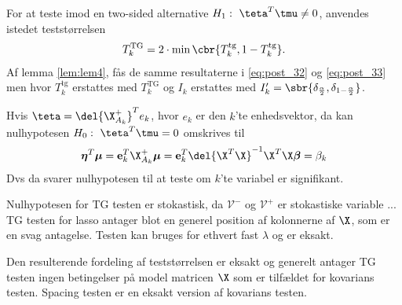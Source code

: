 For at teste imod en two-sided alternative \(H_1: \ \teta^T \tmu \neq 0\), anvendes istedet teststørrelsen
\begin{align*}
T_k^\text{TG}= 2 \cdot \min \cbr{T_k^{\text{tg}}, 1-T_k^{\text{tg}}}.
\end{align*}
Af lemma \ref{lem:lem4}, fås de samme resultaterne i \eqref{eq:post_32} og \eqref{eq:post_33} men hvor \(T_k^\text{tg}\) erstattes med \(T_k^\text{TG}\) og \(I_k\) erstattes med \(I_k'= \sbr{\delta_{\frac{\alpha}{2}}, \delta_{1-\frac{\alpha}{2}}}\).


Hvis \(\teta = \del{\X_{A_k}^+}^T e_k\), hvor \(e_k\) er den \(k\)'te enhedsvektor, da kan nulhypotesen \(H_0: \ \teta^T \tmu =0\) omskrives til
\begin{align*}
\boldsymbol{\eta}^T \boldsymbol{\mu} = \mathbf{e}_k^T \X_{A_k}^+ \boldsymbol{\mu} = \mathbf{e}_k^T \del{\X^T \X}^{-1} \X^T \X \boldsymbol{\beta} = \beta_k
\end{align*}
Dvs da svarer nulhypotesen til at teste om \(k\)'te variabel er signifikant.


Nulhypotesen for TG testen er stokastisk, da \(\mathcal{V}^-\) og \(\mathcal{V}^+\) er stokastiske variable ...
TG testen for lasso antager blot en generel position af kolonnerne af \(\X\), som er en svag antagelse.
Testen kan bruges for ethvert fast \(\lambda\) og er eksakt.

Den resulterende fordeling af teststørrelsen er eksakt og generelt antager TG testen ingen betingelser på model matricen \(\X\) som er tilfældet for kovarians testen.
Spacing testen er en eksakt version af kovarians testen. 
\newpage

